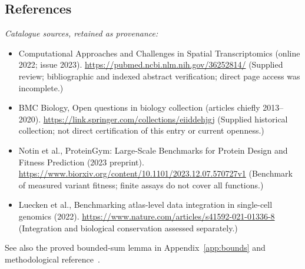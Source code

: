 \documentclass[11pt]{article}
\begin{document}
\subsection{References}
\noindent\emph{Catalogue sources, retained as provenance:}
\begin{itemize}
\item Computational Approaches and Challenges in Spatial Transcriptomics (online 2022; issue 2023). \url{https://pubmed.ncbi.nlm.nih.gov/36252814/} (Supplied review; bibliographic and indexed abstract verification; direct page access was incomplete.)
\item BMC Biology, Open questions in biology collection (articles chiefly 2013--2020). \url{https://link.springer.com/collections/eiiddehjgj} (Supplied historical collection; not direct certification of this entry or current openness.)
\item Notin et al., ProteinGym: Large-Scale Benchmarks for Protein Design and Fitness Prediction (2023 preprint). \url{https://www.biorxiv.org/content/10.1101/2023.12.07.570727v1} (Benchmark of measured variant fitness; finite assays do not cover all functions.)
\item Luecken et al., Benchmarking atlas-level data integration in single-cell genomics (2022). \url{https://www.nature.com/articles/s41592-021-01336-8} (Integration and biological conservation assessed separately.)
\end{itemize}
\noindent See also the proved bounded-sum lemma in Appendix~\ref{app:bounds} and methodological reference~\cite{hoeffding}.
\end{document}
